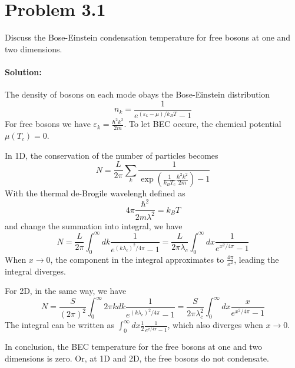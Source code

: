 \section*{Problem 3.1}
Discuss the Bose-Einstein condensation temperature for free bosons at one and two dimensions.
\paragraph*{Solution:}
The density of bosons on each mode obays the Bose-Einstein distribution
\begin{equation}
    n_k = \frac{1}{e^{\left(\varepsilon _k - \mu\right) /k_BT}-1}
\end{equation}
For free bosons we have $\varepsilon_k = \frac{\hbar^2k^2}{2m}$. To let BEC occure, the chemical potential $\mu(T_c)=0$. 

In 1D, the conservation of the number of particles becomes
\begin{equation}
    N = \frac{L}{2\pi}\sum _k \frac{1}{\exp\left({\frac{1}{k_BT_c}\frac{\hbar^2k^2}{2m}}\right)-1}
\end{equation}
With the thermal de-Brogile wavelengh defined as 
\begin{equation}
    4\pi\frac{\hbar^2}{2m\lambda ^2} = k_BT
\end{equation}
and change the summation into integral, we have
\begin{equation}
    N = \frac{L}{2\pi}\int_{0}^{\infty} dk  \frac{1}{e^{(k\lambda_c)^2/4\pi}-1} = \frac{L}{2\pi \lambda_c}\int_{0}^{\infty} dx \frac{1}{e^{x^2/4\pi}-1}
\end{equation}
When $x \to 0$, the component in the integral approximates to $\frac{4 \pi}{x^2} $, leading the integral diverges.

For 2D, in the same way, we have
\begin{equation}
    N = \frac{S}{(2\pi)^2}\int_{0}^{\infty} 2\pi k dk  \frac{1}{e^{(k\lambda_c)^2/4\pi}-1} = \frac{S}{2\pi \lambda_c^2}\int_{0}^{\infty} dx \frac{x}{e^{x^2/4\pi}-1}
\end{equation}
The integral can be written as $\int_{0}^{\infty}dx \frac{1}{2}\frac{1}{e^{x/4\pi}-1}$, which also diverges when $x \to 0$.

In conclusion, the BEC temperature for the free bosons at one and two dimensions is zero. Or, at 1D and 2D, the free bosons do not condensate.